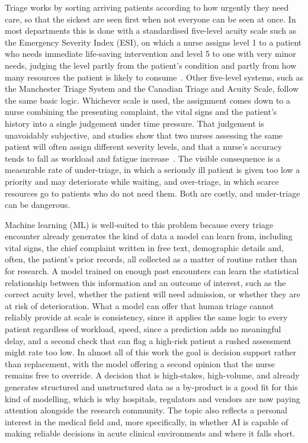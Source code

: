 \documentclass[11pt]{article}
\begin{document}
Triage works by sorting arriving patients according to how urgently they need care, so that the sickest are seen first when not everyone can be seen at once. In most departments this is done with a standardised five-level acuity scale such as the Emergency Severity Index (ESI), on which a nurse assigns level 1 to a patient who needs immediate life-saving intervention and level 5 to one with very minor needs, judging the level partly from the patient's condition and partly from how many resources the patient is likely to consume~\cite{Ivanov2021}. Other five-level systems, such as the Manchester Triage System and the Canadian Triage and Acuity Scale, follow the same basic logic. Whichever scale is used, the assignment comes down to a nurse combining the presenting complaint, the vital signs and the patient's history into a single judgement under time pressure. That judgement is unavoidably subjective, and studies show that two nurses assessing the same patient will often assign different severity levels, and that a nurse's accuracy tends to fall as workload and fatigue increase~\cite{Ivanov2021}. The visible consequence is a measurable rate of under-triage, in which a seriously ill patient is given too low a priority and may deteriorate while waiting, and over-triage, in which scarce resources go to patients who do not need them. Both are costly, and under-triage can be dangerous.

Machine learning (ML) is well-suited to this problem because every triage encounter already generates the kind of data a model can learn from, including vital signs, the chief complaint written in free text, demographic details and, often, the patient's prior records, all collected as a matter of routine rather than for research. A model trained on enough past encounters can learn the statistical relationship between this information and an outcome of interest, such as the correct acuity level, whether the patient will need admission, or whether they are at risk of deterioration. What a model can offer that human triage cannot reliably provide at scale is consistency, since it applies the same logic to every patient regardless of workload, speed, since a prediction adds no meaningful delay, and a second check that can flag a high-risk patient a rushed assessment might rate too low. In almost all of this work the goal is decision support rather than replacement, with the model offering a second opinion that the nurse remains free to override. A decision that is high-stakes, high-volume, and already generates structured and unstructured data as a by-product is a good fit for this kind of modelling, which is why hospitals, regulators and vendors are now paying attention alongside the research community. The topic also reflects a personal interest in the medical field and, more specifically, in whether AI is capable of making reliable decisions in acute clinical environments and where it falls short.
\end{document}
